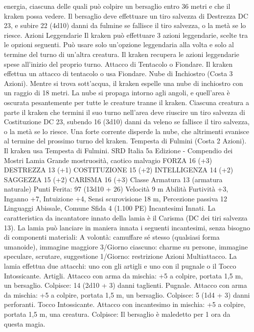 \begin{multicols}{2}
energia, ciascuna delle quali può colpire un bersaglio entro 36
metri e che il kraken possa vedere. Il bersaglio deve effettuare un
tiro salvezza di Destrezza DC 23, e subire 22 (4d10) danni da
fulmine se fallisce il tiro salvezza, o la metà se lo riesce.
Azioni Leggendarie
Il kraken può effettuare 3 azioni leggendarie, scelte tra le opzioni
seguenti. Può usare solo un’opzione leggendaria alla volta e solo
al termine del turno di un’altra creatura. Il kraken recupera le
azioni leggendarie spese all’inizio del proprio turno.
Attacco di Tentacolo o Fiondare. Il kraken effettua un attacco
di tentacolo o usa Fiondare.
Nube di Inchiostro (Costa 3 Azioni). Mentre si trova
sott’acqua, il kraken espelle una nube di inchiostro con un raggio
di 18 metri. La nube si propaga intorno agli angoli, e quell’area è
oscurata pesantemente per tutte le creature tranne il kraken.
Ciascuna creatura a parte il kraken che termini il suo turno
nell’area deve riuscire un tiro salvezza di Costituzione DC 23,
subendo 16 (3d10) danni da veleno se fallisce il tiro salvezza, o
la metà se lo riesce. Una forte corrente disperde la nube, che
altrimenti svanisce al termine del prossimo turno del kraken.
Tempesta di Fulmini (Costa 2 Azioni). Il kraken usa Tempesta
di Fulmini.
SRD Italia 5a Edizione - Compendio dei Mostri
Lamia
Grande mostruosità, caotico malvagio
FORZA 16 (+3)
DESTREZZA 13 (+1)
COSTITUZIONE 15 (+2)
INTELLIGENZA 14 (+2)
SAGGEZZA 15 (+2)
CARISMA 16 (+3)
Classe Armatura 13 (armatura naturale)
\hspace*{0pt}\hfill{Punti Ferita}: 97 (13d10 + 26)
Velocità 9 m
Abilità Furtività +3, Inganno +7, Intuizione +4,
Sensi scurovisione 18 m, Percezione passiva 12
Linguaggi Abissale, Comune
Sfida 4 (1.100 PE)
Incantesimi Innati. La caratteristica da incantatore innato della
lamia è il Carisma (DC dei tiri salvezza 13). La lamia può
lanciare in maniera innata i seguenti incantesimi, senza bisogno
di componenti materiali:
A volontà: camuffare sé stesso (qualsiasi forma umanoide),
immagine maggiore
3/Giorno ciascuno: charme su persone, immagine speculare,
scrutare, suggestione
1/Giorno: restrizione
Azioni
Multiattacco. La lamia effettua due attacchi: uno con gli artigli e
uno con il pugnale o il Tocco Intossicante.
Artigli. Attacco con arma da mischia: +5 a colpire, portata 1,5
m, un bersaglio.
Colpisce: 14 (2d10 + 3) danni taglienti.
Pugnale. Attacco con arma da mischia: +5 a colpire, portata 1,5
m, un bersaglio.
Colpisce: 5 (1d4 + 3) danni perforanti.
Tocco Intossicante. Attacco con incantesimo in mischia: +5 a
colpire, portata 1,5 m, una creatura.
Colpisce: Il bersaglio è maledetto per 1 ora da questa magia.

\end{multicols}
